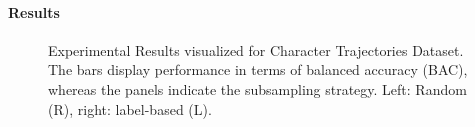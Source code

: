 \documentclass{article}
\begin{document}
\paragraph{Results}
%
\begin{figure}[tbp]
  \caption{Experimental Results visualized for Character Trajectories Dataset.
  The bars display performance in terms of balanced accuracy (BAC),
whereas the panels indicate the subsampling strategy.
  Left: Random (R), right: label-based (L).}
  \label{fig:results_main}
\end{figure}
\end{document}
